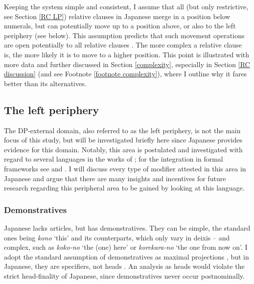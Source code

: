 Keeping the system simple and consistent, I assume that all (but only restrictive, see Section \ref{RC LP}) relative clauses in Japanese merge in a position below numerals, but can potentially move up to a position above, or also to the left periphery (see below). This assumption predicts that such movement operations are open potentially to all relative clauses \citep{kim:2019:syntax}. The more complex a relative clause is, the more likely it is to move to a higher position. This point is illustrated with more data and further discussed in Section \ref{complexity}, especially in Section \ref{RC discussion} (and see Footnote \ref{footnote complexity}), where I outline why it fares better than its alternatives.

\subsection{The left periphery} \label{externaldp}

The DP-external domain, also referred to as the left periphery, is not the main focus of this study, but will be investigated briefly here since Japanese provides evidence for this domain. Notably, this area is postulated and investigated with regard to several languages in the works of \citet{giusti:1996:is, dimitrova:1998:fragments, ihsane:2001:specific, aboh:2004:topic, aboh:2006:when, roca:2009:left, bastos:2011:info, giusti:2016:latin, roehrs:2019:left, roehrs:2025:DP, kim:2019:syntax}; for the integration in formal frameworks see \citet{laenzlinger:2011:elements} and \citet{grohmann:2003:prolific}. I will discuss every type of modifier attested in this area in Japanese and argue that there are many insights and incentives for future research regarding this peripheral area to be gained by looking at this language.

\subsubsection{Demonstratives}

Japanese lacks articles, but has demonstratives. They can be simple, the standard ones being \textit{kono} `this’ and its counterparts, which only vary in deixis – and complex, such as \textit{koko-no} `the (one) here’ or \textit{korekara-no} `the one from now on’. I adopt the standard assumption of demonstratives as maximal projections \citep{laenzlinger:2005:french, laenzlinger:2011:elements, kim:2019:syntax}, but in Japanese, they are specifiers, not heads \citep{kuno:1973:structure, kuroda:1992:japanese}. An analysis as heads would violate the strict head-finality of Japanese, since demonstratives never occur postnominally.

